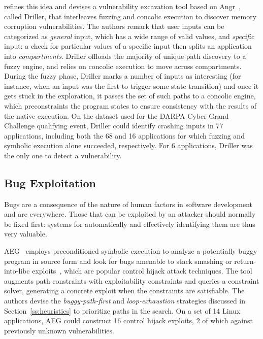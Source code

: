 \cite{DRILLER-NDSS16} refines this idea and devises a vulnerability excavation tool based on {\sc Angr}~\cite{ANGR-SSP16}, called Driller, that interleaves fuzzing and concolic execution to discover memory corruption vulnerabilities. The authors remark that user inputs can be categorized as {\em general} input, which has a wide range of valid values, and {\em specific} input: a check for particular values of a specific input then splits an application into {\em compartments}. Driller offloads the majority of unique path discovery to a fuzzy engine, and relies on concolic execution to move across compartments. During the fuzzy phase, Driller marks a number of inputs as interesting (for instance, when an input was the first to trigger some state transition) and once it gets stuck in the exploration, it passes the set of such paths to a concolic engine, which preconstraints the program states to ensure consistency with the results of the native execution. On the dataset used for the DARPA Cyber Grand Challenge qualifying event, Driller could identify crashing inputs in 77 applications, including both the 68 and 16 applications for which fuzzing and symbolic execution alone succeeded, respectively. For 6 applications, Driller was the only one to detect a vulnerability.


\subsection{Bug Exploitation}
\label{ss:bug-exploitation}
Bugs are a consequence of the nature of human factors in software development and are everywhere. Those that can be exploited by an attacker should normally be fixed first: systems for automatically and effectively identifying them are thus very valuable.

{\sc AEG}~\cite{AEG-NDSS11} employs preconditioned symbolic execution to analyze a potentially buggy program in source form and look for bugs amenable to stack smashing or return-into-libc exploits~\cite{PB-SSP04}, which are popular control hijack attack techniques. The tool augments path constraints with exploitability constraints and queries a constraint solver, generating a concrete exploit when the constraints are satisfiable. The authors devise the {\em buggy-path-first} and {\em loop-exhaustion} strategies discussed in Section~\ref{ss:heuristics} to prioritize paths in the search. On a set of 14 Linux applications, {\sc AEG} could construct 16 control hijack exploits, 2 of which against previously unknown vulnerabilities.

